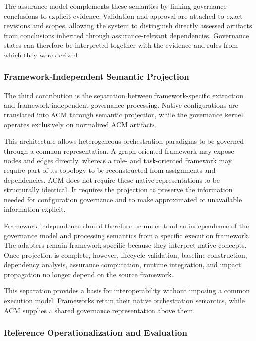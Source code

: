 \documentclass[10pt]{article}
\begin{document}
The assurance model complements these semantics by linking governance conclusions to explicit evidence. Validation and approval are attached to exact revisions and scopes, allowing the system to distinguish directly assessed artifacts from conclusions inherited through assurance-relevant dependencies. Governance states can therefore be interpreted together with the evidence and rules from which they were derived.

\subsubsection{Framework-Independent Semantic Projection}

The third contribution is the separation between framework-specific extraction and framework-independent governance processing. Native configurations are translated into ACM through semantic projection, while the governance kernel operates exclusively on normalized ACM artifacts.

This architecture allows heterogeneous orchestration paradigms to be governed through a common representation. A graph-oriented framework may expose nodes and edges directly, whereas a role- and task-oriented framework may require part of its topology to be reconstructed from assignments and dependencies. ACM does not require these native representations to be structurally identical. It requires the projection to preserve the information needed for configuration governance and to make approximated or unavailable information explicit.

Framework independence should therefore be understood as independence of the governance model and processing semantics from a specific execution framework. The adapters remain framework-specific because they interpret native concepts. Once projection is complete, however, lifecycle validation, baseline construction, dependency analysis, assurance computation, runtime integration, and impact propagation no longer depend on the source framework.

This separation provides a basis for interoperability without imposing a common execution model. Frameworks retain their native orchestration semantics, while ACM supplies a shared governance representation above them.

\subsubsection{Reference Operationalization and Evaluation}
\end{document}
